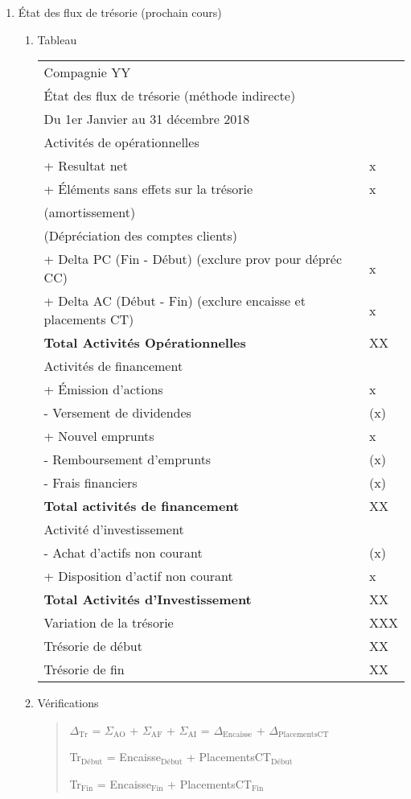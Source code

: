 \documentclass[11pt]{article}
\begin{document}
\begin{enumerate}
\begin{enumerate}
\item État des flux de trésorie (prochain cours)
\label{sec:orgde81623}
\begin{enumerate}
\item Tableau
\label{sec:orgc9ccbe7}
\begin{center}
\begin{tabular}{ll}
\hline
Compagnie YY & \\
État des flux de trésorie (méthode indirecte) & \\
Du 1er Janvier au 31 décembre 2018 & \\
\hline
Activités de opérationnelles & \\
\hline
+ Resultat net & x\\
+ Éléments sans effets sur la trésorie & x\\
(amortissement) & \\
(Dépréciation des comptes clients) & \\
+ Delta PC (Fin - Début) (exclure prov pour dépréc CC) & x\\
+ Delta AC (Début - Fin) (exclure encaisse et placements CT) & x\\
\hline
\textbf{Total Activités Opérationnelles} & XX\\
\hline
Activités de financement & \\
\hline
+ Émission d'actions & x\\
- Versement de dividendes & (x)\\
+ Nouvel emprunts & x\\
- Remboursement d'emprunts & (x)\\
- Frais financiers & (x)\\
\hline
\textbf{Total activités de financement} & XX\\
\hline
Activité d'investissement & \\
\hline
- Achat d'actifs non courant & (x)\\
+ Disposition d'actif non courant & x\\
\hline
\textbf{Total Activités d'Investissement} & XX\\
\hline
Variation de la trésorie & XXX\\
Trésorie de début & XX\\
Trésorie de fin & XX\\
\end{tabular}
\end{center}

\item Vérifications
\label{sec:orgec18a87}
\begin{quote}
\(\Delta_{\text{Tr}}\) = \(\Sigma_{\text{AO}}\) + \(\Sigma_{\text{AF}}\) + \(\Sigma_{\text{AI}}\)
= \(\Delta_{\text{Encaisse}}\) + \(\Delta_{\text{PlacementsCT}}\)

Tr\(_{\text{Début}}\) = Encaisse\(_{\text{Début}}\) + PlacementsCT\(_{\text{Début}}\)

Tr\(_{\text{Fin}}\) = Encaisse\(_{\text{Fin}}\) + PlacementsCT\(_{\text{Fin}}\)
\end{quote}
\end{enumerate}
\end{enumerate}
\end{enumerate}
\end{document}
